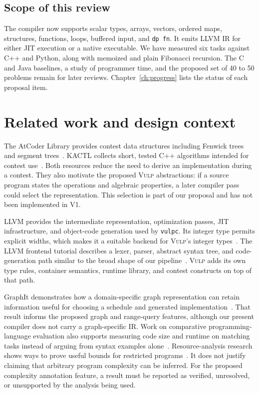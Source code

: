 \documentclass[12pt,a4paper]{report}
\newcommand{\vulp}{\textsc{Vulp}}
\begin{document}
\section{Scope of this review}
The compiler now supports scalar types, arrays, vectors, ordered maps, structures, functions, loops, buffered input, and \texttt{dp fn}. It emits LLVM IR for either JIT execution or a native executable. We have measured six tasks against C++ and Python, along with memoized and plain Fibonacci recursion. The C and Java baselines, a study of programmer time, and the proposed set of 40 to 50 problems remain for later reviews. Chapter~\ref{ch:progress} lists the status of each proposal item.

\chapter{Related work and design context}
The AtCoder Library provides contest data structures including Fenwick trees and segment trees~\cite{atcoder}. KACTL collects short, tested C++ algorithms intended for contest use~\cite{kactl}. Both resources reduce the need to derive an implementation during a contest. They also motivate the proposed \vulp{} abstractions: if a source program states the operations and algebraic properties, a later compiler pass could select the representation. This selection is part of our proposal and has not been implemented in V1.

LLVM provides the intermediate representation, optimization passes, JIT infrastructure, and object-code generation used by \texttt{vulpc}. Its integer type permits explicit widths, which makes it a suitable backend for \vulp{}'s integer types~\cite{llvmref}. The LLVM frontend tutorial describes a lexer, parser, abstract syntax tree, and code-generation path similar to the broad shape of our pipeline~\cite{llvmtutorial}. \vulp{} adds its own type rules, container semantics, runtime library, and contest constructs on top of that path.

GraphIt demonstrates how a domain-specific graph representation can retain information useful for choosing a schedule and generated implementation~\cite{graphit}. That result informs the proposed graph and range-query features, although our present compiler does not carry a graph-specific IR. Work on comparative programming-language evaluation also supports measuring code size and runtime on matching tasks instead of arguing from syntax examples alone~\cite{nanz}. Resource-analysis research shows ways to prove useful bounds for restricted programs~\cite{knoth}. It does not justify claiming that arbitrary program complexity can be inferred. For the proposed complexity annotation feature, a result must be reported as verified, unresolved, or unsupported by the analysis being used.
\end{document}
